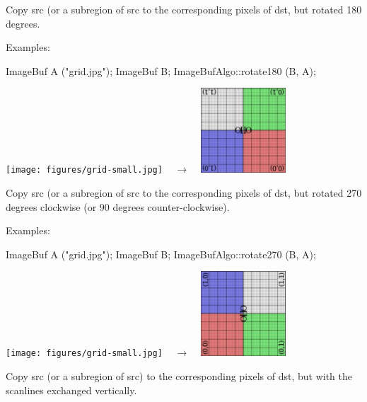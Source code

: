  
Copy {\cf src} (or a subregion of {\cf src} to the corresponding pixels
of {\cf dst}, but rotated 180 degrees.

\smallskip
\noindent Examples:
\begin{code}
    ImageBuf A ("grid.jpg");
    ImageBuf B;
    ImageBufAlgo::rotate180 (B, A);
\end{code}
\spc \texttt{[image: figures/grid-small.jpg]}
~ {\Huge $\rightarrow$} ~
\includegraphics[width=1.25in]{figures/rotate180.jpg} \\
\apiend


 
Copy {\cf src} (or a subregion of {\cf src} to the corresponding pixels
of {\cf dst}, but rotated 270 degrees clockwise (or 90 degrees
counter-clockwise).

\smallskip
\noindent Examples:
\begin{code}
    ImageBuf A ("grid.jpg");
    ImageBuf B;
    ImageBufAlgo::rotate270 (B, A);
\end{code}
\spc \texttt{[image: figures/grid-small.jpg]}
~ {\Huge $\rightarrow$} ~
\includegraphics[width=1.25in]{figures/rotate270.jpg} \\
\apiend


 
Copy {\cf src} (or a subregion of {\cf src}) to the corresponding pixels
of {\cf dst}, but with the scanlines exchanged vertically.

